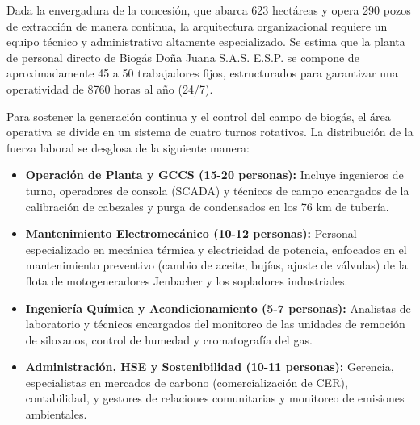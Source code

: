 \documentclass[11pt,letterpaper]{article}
\begin{document}
Dada la envergadura de la concesión, que abarca 623 hectáreas y opera 290 pozos
de extracción de manera continua, la arquitectura organizacional requiere un
equipo técnico y administrativo altamente especializado. Se estima que la planta
de personal directo de Biogás Doña Juana S.A.S. E.S.P. se compone de
aproximadamente 45 a 50 trabajadores fijos, estructurados para garantizar una
operatividad de 8760 horas al año (24/7).

Para sostener la generación continua y el control del campo de biogás, el área
operativa se divide en un sistema de cuatro turnos rotativos. La distribución de
la fuerza laboral se desglosa de la siguiente manera:

\begin{itemize}

  \item \textbf{Operación de Planta y GCCS (15-20 personas):} Incluye ingenieros
    de turno, operadores de consola (SCADA) y técnicos de campo encargados de la
    calibración de cabezales y purga de condensados en los 76 km de tubería.

  \item \textbf{Mantenimiento Electromecánico (10-12 personas):} Personal
    especializado en mecánica térmica y electricidad de potencia, enfocados en
    el mantenimiento preventivo (cambio de aceite, bujías, ajuste de válvulas)
    de la flota de motogeneradores Jenbacher y los sopladores industriales.

  \item \textbf{Ingeniería Química y Acondicionamiento (5-7 personas):}
    Analistas de laboratorio y técnicos encargados del monitoreo de las unidades
    de remoción de siloxanos, control de humedad y cromatografía del gas.

  \item \textbf{Administración, HSE y Sostenibilidad (10-11 personas):}
    Gerencia, especialistas en mercados de carbono (comercialización de CER),
    contabilidad, y gestores de relaciones comunitarias y monitoreo de emisiones
    ambientales.

\end{itemize}
\end{document}
